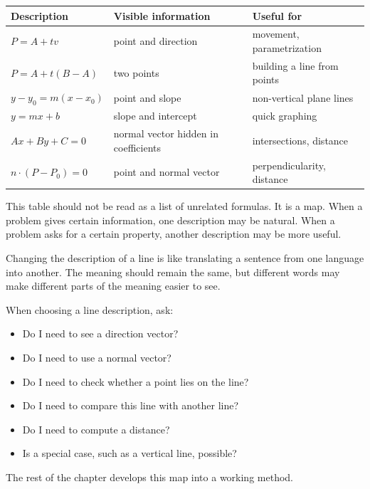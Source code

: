 \begin{center}
\begin{tabular}{lll}
\toprule
Description & Visible information & Useful for \\
\midrule
\(P=A+tv\) & point and direction & movement, parametrization \\
\(P=A+t(B-A)\) & two points & building a line from points \\
\(y-y_0=m(x-x_0)\) & point and slope & non-vertical plane lines \\
\(y=mx+b\) & slope and intercept & quick graphing \\
\(Ax+By+C=0\) & normal vector hidden in coefficients & intersections, distance \\
\(n\cdot(P-P_0)=0\) & point and normal vector & perpendicularity, distance \\
\bottomrule
\end{tabular}
\end{center}

This table should not be read as a list of unrelated formulas. It is a map. When a problem gives certain information, one description may be natural. When a problem asks for a certain property, another description may be more useful.

\begin{remarkbox}
Changing the description of a line is like translating a sentence from one language into another. The meaning should remain the same, but different words may make different parts of the meaning easier to see.
\end{remarkbox}

\begin{summarybox}
When choosing a line description, ask:
\begin{itemize}
\item Do I need to see a direction vector?
\item Do I need to use a normal vector?
\item Do I need to check whether a point lies on the line?
\item Do I need to compare this line with another line?
\item Do I need to compute a distance?
\item Is a special case, such as a vertical line, possible?
\end{itemize}
\end{summarybox}

The rest of the chapter develops this map into a working method.